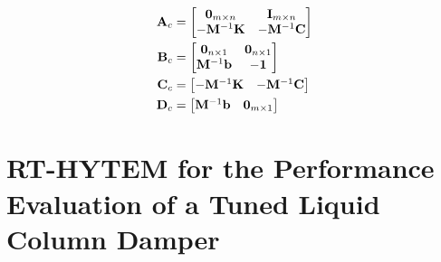 \begin{align}
\mathbf{A}_{c}&=\begin{bmatrix} \mathbf{0}_{m\times n}&\mathbf{I}_{m \times n}\\-\mathbf{M}^{-1}\mathbf{K}&-\mathbf{M}^{-1}\mathbf{C}\end{bmatrix} \label{eq:3-4}\\
\mathbf{B}_{c}&=\begin{bmatrix} \mathbf{0}_{n\times 1}&\mathbf{0}_{n\times 1}\\ \mathbf{M}^{-1}\mathbf{b}&\mathbf{-1}\end{bmatrix} \label{eq:3-5}\\
\mathbf{C}_{c}&=\begin{bmatrix} -\mathbf{M}^{-1}\mathbf{K}&-\mathbf{M}^{-1}\mathbf{C}\end{bmatrix} \label{eq:3-6}\\
\mathbf{D}_{c}&=\begin{bmatrix} \mathbf{M}^{-1}\mathbf{b}&\mathbf{0}_{m \times 1}\end{bmatrix} \label{eq:3-7}
\end{align}


\section{RT-HYTEM for the Performance Evaluation of a Tuned Liquid Column Damper}
\label{chap:4}

